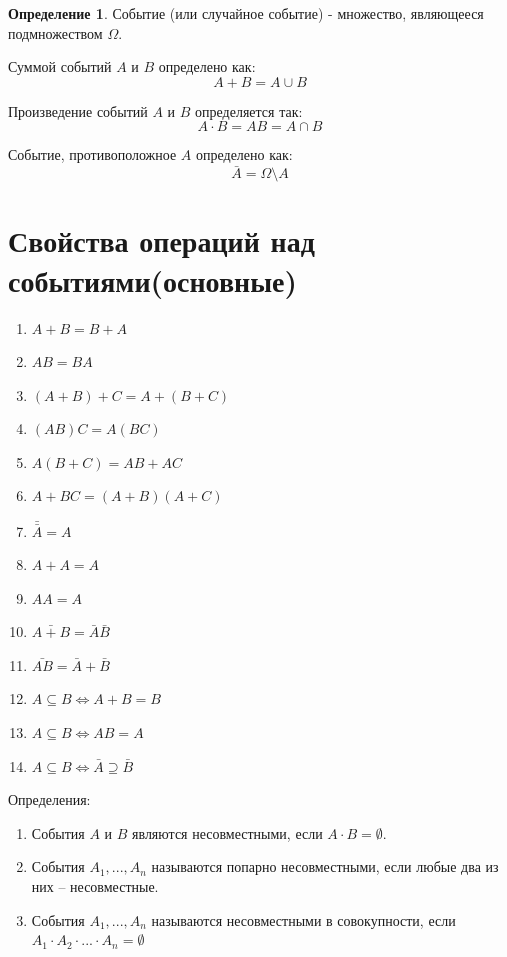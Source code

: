 \documentclass[a4paper, 14pt]{report}
\theoremstyle{definition}
\newtheorem*{definition}{Определение}
\begin{document}
			\begin{definition}
				Событие (или случайное событие) - множество, являющееся подмножеством $\Omega$.
			\end{definition}
			
			Суммой событий $A$ и $B$ определено как:
			\begin{equation}
				A+B=A\cup B
			\end{equation}
		
			Произведение событий $A$ и $B$ определяется так:
			\begin{equation}
				A\cdot B=AB=A\cap B
			\end{equation}
			
			Событие, противоположное $A$ определено как:
			\begin{equation}
				\bar{A}=\Omega\setminus A
			\end{equation}
		
	\section{Свойства операций над событиями(основные)}
		\begin{enumerate}
			\item $A+B=B+A$
			\item $AB=BA$
			\item $(A+B)+C=A+(B+C)$
			\item $(AB)C=A(BC)$
			\item $A(B+C)=AB+AC$
			\item $A+BC=(A+B)(A+C)$
			\item $\bar{\bar{A}}=A$
			\item $A+A=A$
			\item $AA=A$
			\item $\bar{A+B}=\bar{A}\bar{B}$
			\item $\bar{AB}=\bar{A}+\bar{B}$
			\item $A\subseteq B\Leftrightarrow A+B=B$
			\item $A\subseteq B\Leftrightarrow AB=A$
			\item $A\subseteq B\Leftrightarrow \bar{A}\supseteq\bar{B}$
		\end{enumerate}
		
		Определения:
		\begin{enumerate}
			\item События $A$ и $B$ являются несовместными, если $A\cdot B=\emptyset$.
			\item События $A_1,...,A_n$ называются попарно несовместными, если любые два из них -- несовместные.
			\item События $A_1,...,A_n$ называются несовместными в совокупности, если\newline$A_1\cdot A_2\cdot...\cdot A_n=\emptyset$
		\end{enumerate}
		
\end{document}

